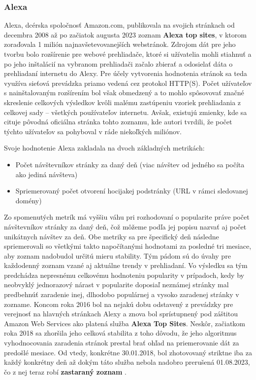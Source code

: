 \subsubsection{Alexa}

Alexa, dcérska spoločnosť Amazon.com, publikovala na svojich stránkach od decembra 2008 až po začiatok augusta 2023 zoznam \textbf{Alexa top sites}, v ktorom zoraďovala 1 milión najnavšetevovanejších webstránok. \cite{tranco-methodology}
Zdrojom dát pre jeho tvorbu bolo rozšírenie pre webové prehliadače, ktoré si užívatelia mohli stiahnuť a po jeho inštalácií na vybranom prehliadači začalo zbierať a odosielať
dáta o prehliadaní internetu do Alexy. Pre účely vytvorenia hodnotenia stránok sa teda využíva sieťová prevádzka priamo vedená cez protokol HTTP(S). Počet užívateľov s nainštalovaným rozšírením bol však obmedzený 
a to mohlo spôsovovať značné skreslenie celkových výsledkov kvôli malému zastúpeniu vzoriek prehliadania z celkovej sady -- všetkých používateľov internetu. Avšak, existujú zmienky, 
kde sa cituje pôvodná oficiálna stránka tohto zoznamu, kde autori tvrdili, že počet týchto užívateľov sa pohyboval v ráde niekoľkých miliónov. \cite{tranco}

Svoje hodnotenie Alexa zakladala na dvoch základných metrikách: \cite{kinsta-alexa-rank-article}\cite{tranco}
\begin{itemize}
    \item Počet návštevníkov stránky za daný deň (viac návštev od jedného sa počíta ako jediná návšteva)
    \item Spriemerovaný počet otvorení hocijakej podstránky (URL v rámci sledovanej domény)
\end{itemize}

Zo spomenutých metrík má vyššiu váhu pri rozhodovaní o popularite práve počet návštevníkov stránky za daný deň, čož môžeme podľa jej popisu nazvať aj počet unikátnych návštev za deň. \cite{tranco}
Obe metriky sa pre špecifický deň následne spriemerovali so všetkými takto napočítanými hodnotami za posledné tri mesiace, aby zoznam nadobudol určitú mieru stability. 
Tým pádom sú do úvahy pre každodenný zoznam vzané aj aktuálne trendy v prehliadaní. Vo výsledku sa tým predchádza nepresnému celkovému hodnoteniu popularity v prípadoch, 
kedy by neobvyklý jednorazový nárast v popularite doposiaľ neznámej stránky mal predbehnúť zaradenie inej, dlhodobo populárnej a vysoko zaradenej stránky v zozname. 
Koncom roka 2016 bol na nejakú dobu odstavený z prevádzky pre verejnosť na hlavných stránkach Alexy a znova bol sprístupnený pod záštitou Amazon Web Services ako platená služba \textbf{Alexa Top Sites}. 
Neskôr, začiatkom roka 2018 sa zhoršila jeho celková stabilita z toho dôvodu, že jeho algoritmus vyhodnocovania zaradenia stránok prestal brať ohľad na priemerovanie dát za predošlé mesiace.
Od vtedy, konkrétne 30.01.2018, bol zhotovovaný striktne iba za každý konkrétny deň \cite{tranco} až dokým táto služba nebola nadobro prerušená 01.08.2023, čo z nej teraz robí \textbf{zastaraný zoznam} \cite{tranco-methodology}.


